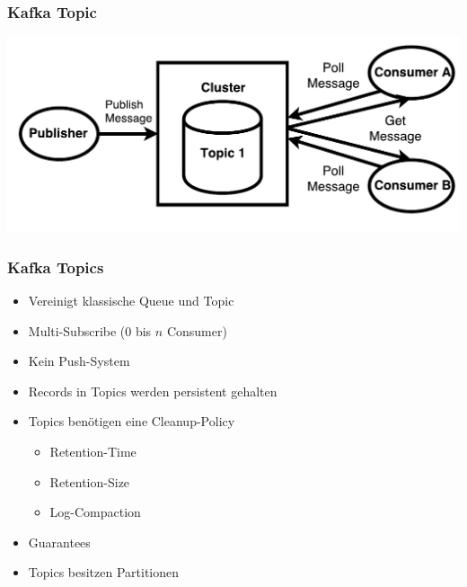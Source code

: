 \begin{frame}
\frametitle{Kafka Topic}
\centering
\includegraphics[scale=0.6]{figure/Kafka_topic_draw_Poll.pdf}
\end{frame}

\begin{frame}
\frametitle{Kafka Topics}
\begin{itemize}
	\item Vereinigt klassische Queue und Topic
	\item Multi-Subscribe ($0$ bis $n$ Consumer)		%
	\item Kein Push-System
	\item Records in Topics werden persistent gehalten
	\item Topics benötigen eine Cleanup-Policy
		\begin{itemize}
			\item Retention-Time
			\item Retention-Size
			\item Log-Compaction
		\end{itemize}
	\item Guarantees
	\item Topics besitzen Partitionen
\end{itemize}


\end{frame}

